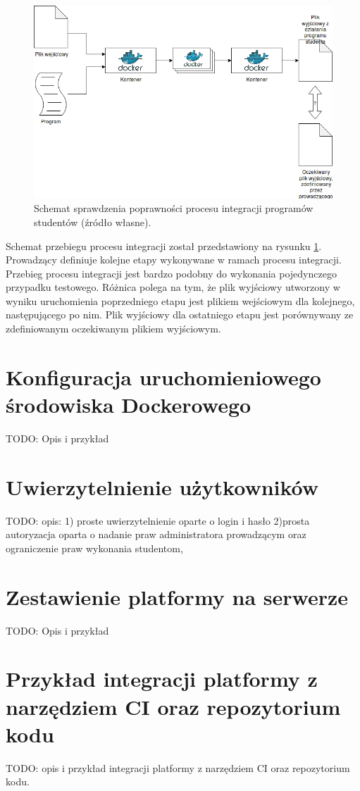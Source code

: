 \begin{figure}[h]
    \centering
    \includegraphics[width = 13cm]{chapter02/integration.png}
    \caption{Schemat sprawdzenia poprawności procesu integracji programów studentów (źródło własne).}
    \label{fig:integration}
\end{figure}

Schemat przebiegu procesu integracji został przedstawiony na rysunku \ref{fig:integration}.
Prowadzący definiuje kolejne etapy wykonywane w ramach procesu integracji.
Przebieg procesu integracji jest bardzo podobny do wykonania pojedynczego przypadku testowego.
Różnica polega na tym, że plik wyjściowy utworzony w wyniku uruchomienia poprzedniego etapu jest plikiem wejściowym dla kolejnego, następującego po nim.
Plik wyjściowy dla ostatniego etapu jest porównywany ze zdefiniowanym oczekiwanym plikiem wyjściowym.

\vfill

\section {Konfiguracja uruchomieniowego środowiska Dockerowego}

TODO: Opis i przykład

\section {Uwierzytelnienie użytkowników}
\label{authorization}

TODO: opis:
1) proste uwierzytelnienie oparte o login i hasło
2)prosta autoryzacja oparta o nadanie praw administratora prowadzącym
oraz ograniczenie praw wykonania studentom,

\section {Zestawienie platformy na serwerze}
\label{run-platform}

TODO: Opis i przykład

\section {Przykład integracji platformy z narzędziem CI oraz repozytorium kodu}
\label{ci-integration}

TODO: opis i przykład integracji platformy z narzędziem CI oraz repozytorium
kodu.
